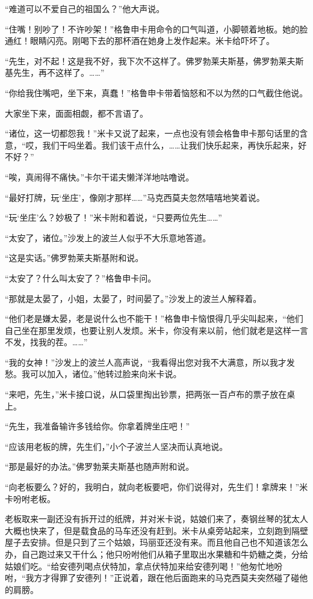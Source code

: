 \par “难道可以不爱自己的祖国么？”他大声说。
\par “住嘴！别吵了！不许吵架！”格鲁申卡用命令的口气叫道，小脚顿着地板。她的脸通红！眼睛闪亮。刚喝下去的那杯酒在她身上发作起来。米卡给吓坏了。
\par “先生，对不起！这是我不好，我下次不这样了。佛罗勃莱夫斯基，佛罗勃莱夫斯基先生，再不这样了。……”
\par “你给我住嘴吧，坐下来，真蠢！”格鲁申卡带着恼怒和不以为然的口气截住他说。
\par 大家坐下来，面面相觑，都不言语了。
\par “诸位，这一切都怨我！”米卡又说了起来，一点也没有领会格鲁申卡那句话里的含意，“哎，我们干吗坐着。我们该干点什么，……让我们快乐起来，再快乐起来，好不好？”
\par “唉，真闹得不痛快。”卡尔干诺夫懒洋洋地咕噜说。
\par “最好打牌，玩‘坐庄’，像刚才那样……”马克西莫夫忽然嘻嘻地笑着说。
\par “玩‘坐庄’么？妙极了！”米卡附和着说，“只要两位先生……”
\par “太安了，诸位。”沙发上的波兰人似乎不大乐意地答道。
\par “这是实话。”佛罗勃莱夫斯基附和说。
\par “太安了？什么叫太安了？”格鲁申卡问。
\par “那就是太晏了，小姐，太晏了，时间晏了。”沙发上的波兰人解释着。
\par “他们老是嫌太晏，老是说什么也不能干！”格鲁申卡恼恨得几乎尖叫起来，“他们自己坐在那里发烦，也要让别人发烦。米卡，你没有来以前，他们就老是这样一言不发，找我的茬。……”
\par “我的女神！”沙发上的波兰人高声说，“我看得出您对我不大满意，所以我才发愁。我可以加入，诸位。”他转过脸来向米卡说。
\par “来吧，先生，”米卡接口说，从口袋里掏出钞票，把两张一百卢布的票子放在桌上。
\par “先生，我准备输许多钱给你。你拿着牌坐庄吧！”
\par “应该用老板的牌，先生们，”小个子波兰人坚决而认真地说。
\par “那是最好的办法。”佛罗勃莱夫斯基也随声附和说。
\par “向老板要么？好的，我明白，就向老板要吧，你们说得对，先生们！拿牌来！”米卡吩咐老板。
\par 老板取来一副还没有拆开过的纸牌，并对米卡说，姑娘们来了，奏钢丝琴的犹太人大概也快来了，但是载食品的马车还没有赶到。米卡从桌旁站起来，立刻跑到隔壁屋子去安排。但是只到了三个姑娘，玛丽亚还没有来。而且他自己也不知道该怎么办，自己跑过来又干什么；他只吩咐他们从箱子里取出水果糖和牛奶糖之类，分给姑娘们吃。“给安德列喝点伏特加，拿点伏特加来给安德列喝！”他匆忙地吩咐，“我方才得罪了安德列！”正说着，跟在他后面跑来的马克西莫夫突然碰了碰他的肩膀。

